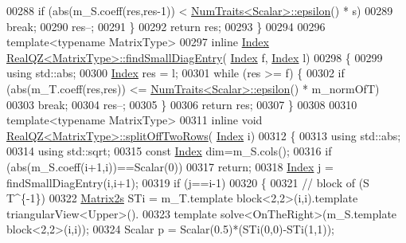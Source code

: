 \begin{DoxyCode}
00288         \textcolor{keywordflow}{if} (abs(m\_S.coeff(res,res-1)) < \hyperlink{group___core___module_struct_eigen_1_1_num_traits}{NumTraits<Scalar>::epsilon}() * s)
00289           \textcolor{keywordflow}{break};
00290         res--;
00291       \}
00292       \textcolor{keywordflow}{return} res;
00293     \}
00294 
00296   \textcolor{keyword}{template}<\textcolor{keyword}{typename} MatrixType>
00297     \textcolor{keyword}{inline} \hyperlink{group___eigenvalues___module_a6201e534e901b5f4e66f72c176b534a3}{Index} \hyperlink{group___eigenvalues___module_class_eigen_1_1_real_q_z}{RealQZ<MatrixType>::findSmallDiagEntry}(
      \hyperlink{group___eigenvalues___module_a6201e534e901b5f4e66f72c176b534a3}{Index} f, \hyperlink{group___eigenvalues___module_a6201e534e901b5f4e66f72c176b534a3}{Index} l)
00298     \{
00299       \textcolor{keyword}{using} std::abs;
00300       \hyperlink{group___eigenvalues___module_a6201e534e901b5f4e66f72c176b534a3}{Index} res = l;
00301       \textcolor{keywordflow}{while} (res >= f) \{
00302         \textcolor{keywordflow}{if} (abs(m\_T.coeff(res,res)) <= \hyperlink{group___core___module_struct_eigen_1_1_num_traits}{NumTraits<Scalar>::epsilon}() * m\_normOfT)
00303           \textcolor{keywordflow}{break};
00304         res--;
00305       \}
00306       \textcolor{keywordflow}{return} res;
00307     \}
00308 
00310   \textcolor{keyword}{template}<\textcolor{keyword}{typename} MatrixType>
00311     \textcolor{keyword}{inline} \textcolor{keywordtype}{void} \hyperlink{group___eigenvalues___module_class_eigen_1_1_real_q_z}{RealQZ<MatrixType>::splitOffTwoRows}(
      \hyperlink{group___eigenvalues___module_a6201e534e901b5f4e66f72c176b534a3}{Index} i)
00312     \{
00313       \textcolor{keyword}{using} std::abs;
00314       \textcolor{keyword}{using} std::sqrt;
00315       \textcolor{keyword}{const} \hyperlink{group___eigenvalues___module_a6201e534e901b5f4e66f72c176b534a3}{Index} dim=m\_S.cols();
00316       \textcolor{keywordflow}{if} (abs(m\_S.coeff(i+1,i))==Scalar(0))
00317         \textcolor{keywordflow}{return};
00318       \hyperlink{group___eigenvalues___module_a6201e534e901b5f4e66f72c176b534a3}{Index} j = findSmallDiagEntry(i,i+1);
00319       \textcolor{keywordflow}{if} (j==i-1)
00320       \{
00321         \textcolor{comment}{// block of (S T^\{-1\})}
00322         \hyperlink{group___core___module_class_eigen_1_1_matrix}{Matrix2s} STi = m\_T.template block<2,2>(i,i).\textcolor{keyword}{template} triangularView<Upper>().
00323           \textcolor{keyword}{template} solve<OnTheRight>(m\_S.template block<2,2>(i,i));
00324         Scalar p = Scalar(0.5)*(STi(0,0)-STi(1,1));

\end{DoxyCode}
